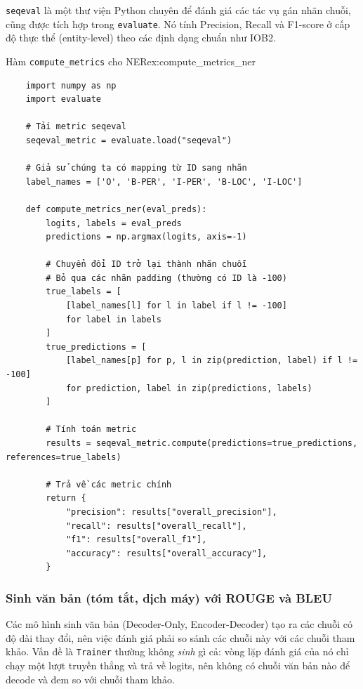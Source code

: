 \texttt{seqeval} là một thư viện Python chuyên để đánh giá các tác vụ gán nhãn chuỗi, cũng được tích hợp trong \texttt{evaluate}. Nó tính Precision, Recall và F1-score ở cấp độ thực thể (entity-level) theo các định dạng chuẩn như IOB2.

\begin{example}{Hàm \texttt{compute\_metrics} cho NER}{ex:compute_metrics_ner}
    \begin{verbatim}
    import numpy as np
    import evaluate

    # Tải metric seqeval
    seqeval_metric = evaluate.load("seqeval")

    # Giả sử chúng ta có mapping từ ID sang nhãn
    label_names = ['O', 'B-PER', 'I-PER', 'B-LOC', 'I-LOC']

    def compute_metrics_ner(eval_preds):
        logits, labels = eval_preds
        predictions = np.argmax(logits, axis=-1)

        # Chuyển đổi ID trở lại thành nhãn chuỗi
        # Bỏ qua các nhãn padding (thường có ID là -100)
        true_labels = [
            [label_names[l] for l in label if l != -100]
            for label in labels
        ]
        true_predictions = [
            [label_names[p] for p, l in zip(prediction, label) if l != -100]
            for prediction, label in zip(predictions, labels)
        ]
        
        # Tính toán metric
        results = seqeval_metric.compute(predictions=true_predictions, references=true_labels)
        
        # Trả về các metric chính
        return {
            "precision": results["overall_precision"],
            "recall": results["overall_recall"],
            "f1": results["overall_f1"],
            "accuracy": results["overall_accuracy"],
        }
    \end{verbatim}
\end{example}

\subsubsection{Sinh văn bản (tóm tắt, dịch máy) với ROUGE và BLEU}
Các mô hình sinh văn bản (Decoder-Only, Encoder-Decoder) tạo ra các chuỗi có độ dài thay đổi, nên việc đánh giá phải so sánh các chuỗi này với các chuỗi tham khảo. Vấn đề là \texttt{Trainer} thường không \emph{sinh} gì cả: vòng lặp đánh giá của nó chỉ chạy một lượt truyền thẳng và trả về logits, nên không có chuỗi văn bản nào để decode và đem so với chuỗi tham khảo.

